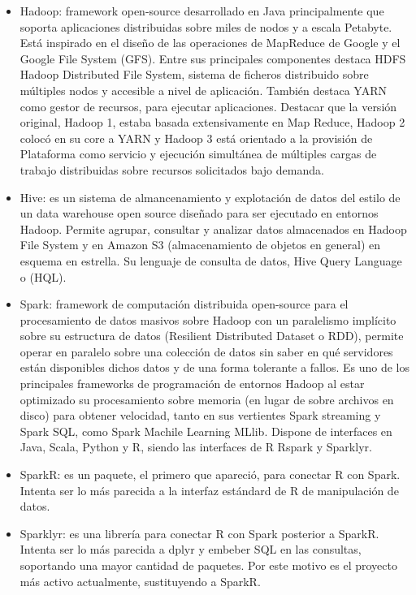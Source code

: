 \documentclass[
]{book}
\theoremstyle{break}
\theoremstyle{nonumberplain}
\begin{document}
\begin{itemize}
\item
  Hadoop: framework open-source desarrollado en Java principalmente que soporta aplicaciones distribuidas sobre miles de nodos y a escala Petabyte. Está inspirado en el diseño de las operaciones de MapReduce de Google y el Google File System (GFS). Entre sus principales componentes destaca HDFS Hadoop Distributed File System, sistema de ficheros distribuido sobre múltiples nodos y accesible a nivel de aplicación. También destaca YARN como gestor de recursos, para ejecutar aplicaciones. Destacar que la versión original, Hadoop 1, estaba basada extensivamente en Map Reduce, Hadoop 2 colocó en su core a YARN y Hadoop 3 está orientado a la provisión de Plataforma como servicio y ejecución simultánea de múltiples cargas de trabajo distribuidas sobre recursos solicitados bajo demanda.
\item
  Hive: es un sistema de almancenamiento y explotación de datos del estilo de un data warehouse open source diseñado para ser ejecutado en entornos Hadoop. Permite agrupar, consultar y analizar datos almacenados en Hadoop File System y en Amazon S3 (almacenamiento de objetos en general) en esquema en estrella. Su lenguaje de consulta de datos, Hive Query Language o (HQL).
\item
  Spark: framework de computación distribuida open-source para el procesamiento de datos masivos sobre Hadoop con un paralelismo implícito sobre su estructura de datos (Resilient Distributed Dataset o RDD), permite operar en paralelo sobre una colección de datos sin saber en qué servidores están disponibles dichos datos y de una forma tolerante a fallos. Es uno de los principales frameworks de programación de entornos Hadoop al estar optimizado su procesamiento sobre memoria (en lugar de sobre archivos en disco) para obtener velocidad, tanto en sus vertientes Spark streaming y Spark SQL, como Spark Machile Learning MLlib. Dispone de interfaces en Java, Scala, Python y R, siendo las interfaces de R Rspark y Sparklyr.
\item
  SparkR: es un paquete, el primero que apareció, para conectar R con Spark. Intenta ser lo más parecida a la interfaz estándard de R de manipulación de datos.
\item
  Sparklyr: es una librería para conectar R con Spark posterior a SparkR. Intenta ser lo más parecida a dplyr y embeber SQL en las consultas, soportando una mayor cantidad de paquetes. Por este motivo es el proyecto más activo actualmente, sustituyendo a SparkR.
\end{itemize}
\end{document}
